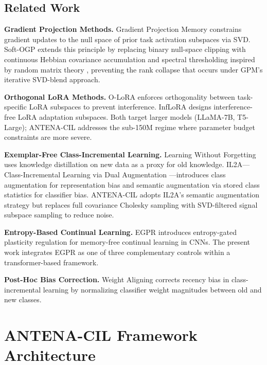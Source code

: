 \documentclass[11pt,a4paper]{article}
\begin{document}
\subsection{Related Work}

\textbf{Gradient Projection Methods.} Gradient Projection Memory \citep[GPM;][]{saha2021gradient} constrains gradient updates to the null space of prior task activation subspaces via SVD. Soft-OGP extends this principle by replacing binary null-space clipping with continuous Hebbian covariance accumulation and spectral thresholding inspired by random matrix theory \citep{ledoit2011eigenvectors}, preventing the rank collapse that occurs under GPM's iterative SVD-blend approach.

\textbf{Orthogonal LoRA Methods.} O-LoRA \citep{wang2023orthogonal} enforces orthogonality between task-specific LoRA subspaces to prevent interference. InfLoRA \citep{liang2024inflora} designs interference-free LoRA adaptation subspaces. Both target larger models (LLaMA-7B, T5-Large); ANTENA-CIL addresses the sub-150M regime where parameter budget constraints are more severe.

\textbf{Exemplar-Free Class-Incremental Learning.} Learning Without Forgetting \citep[LwF;][]{li2017learning} uses knowledge distillation on new data as a proxy for old knowledge. IL2A---Class-Incremental Learning via Dual Augmentation \citep{zhu2021class}---introduces class augmentation for representation bias and semantic augmentation via stored class statistics for classifier bias. ANTENA-CIL adopts IL2A's semantic augmentation strategy but replaces full covariance Cholesky sampling with SVD-filtered signal subspace sampling to reduce noise.

\textbf{Entropy-Based Continual Learning.} EGPR \citep{lemos2026egpr} introduces entropy-gated plasticity regulation for memory-free continual learning in CNNs. The present work integrates EGPR as one of three complementary controls within a transformer-based framework.

\textbf{Post-Hoc Bias Correction.} Weight Aligning \citep[WA;][]{zhao2020maintaining} corrects recency bias in class-incremental learning by normalizing classifier weight magnitudes between old and new classes.

\section{ANTENA-CIL Framework Architecture}
\end{document}
